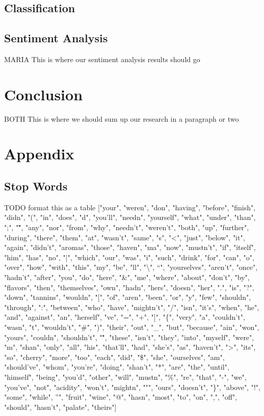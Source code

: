 \documentclass[10pt]{IEEEtran}
\begin{document}
\subsection{Classification}

\subsection{Sentiment Analysis}
    MARIA
    This is where our sentiment analysis results should go

\section{Conclusion}
    BOTH
    This is where we should sum up our research in a paragraph or two

\newpage
\newpage


\newpage
\section{Appendix}

\subsection{Stop Words}
TODO format this as a table
["your", "weren", "don", "having", "before", "finish", "didn", "(", "in", "does", "d", "you'll", "needn", "yourself", "what", "under", "than", ";", "\~", "any", "nor", "from", "why", "needn't", "weren't", "both", "up", "further", "during", "there", "them", "at", "wasn't", "same", "s", "<", "just", "below", "it", "again", "didn't", "aromas", "those", "haven", "ma", "now", "mustn't", "if", "itself", "him", "has", "no", "|", "which", "our", "was", "i", "such", "drink", "for", "can", "o", "over", "how", "with", "this", "my", "be", "ll", "\textbackslash", "`", "yourselves", "aren't", "once", "hadn't", "after", "you", "do", "here", "\&", "me", "where", "about", "don't", "by", "flavors", "then", "themselves", "own", "hadn", "hers", "doesn", "her", ".", "is", "?", "down", "tannins", "wouldn", "[", "of", "aren", "been", "or", "y", "few", "shouldn", "through", ":", "between", "who", "have", "mightn't", "/", "isn", "it's", "when", "he", "and", "against", "an", "herself", "ve", "=", "+", "]", "\{", "very", "a", "couldn't", "wasn", "t", "wouldn't", "\#", ")", "their", "out", "\_", "but", "because", "ain", "won", "yours", "couldn", "shouldn't", "\^", "these", "isn't", "they", "into", "myself", "were", "m", "shan", "only", "all", "his", "that'll", "had", "she's", "as", "haven't", ">", "its", "so", "cherry", "more", "too", "each", "did", "\$", "she", "ourselves", "am", "should've", "whom", "you're", "doing", "shan't", "*", "are", "the", "until", "himself", "being", "you'd", "other", "will", "mustn", "\%", "re", "that", "-", "we", "you've", "not", "acidity", "won't", "mightn", """, "ours", "doesn't", "\}", "above", "!", "some", "while", "'", "fruit", "wine", "@", "hasn", "most", "to", "on", ",", "off", "should", "hasn't", "palate", "theirs"]
\end{document}
